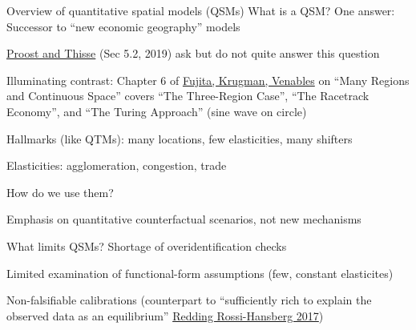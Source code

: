 \documentclass[11pt,notes=hide,aspectratio=169]{beamer}
\begin{document}
\begin{frame}{Overview of quantitative spatial models (QSMs)}
What is a QSM? One answer: Successor to ``new economic geography'' models
\begin{itemize}{\small
\item \href{https://www.aeaweb.org/articles?id=10.1257/jel.20181414}{Proost and Thisse} (Sec 5.2, 2019) ask but do not quite answer this question
\item Illuminating contrast: Chapter 6 of \href{https://direct.mit.edu/books/book/2525/The-Spatial-EconomyCities-Regions-and}{Fujita, Krugman, Venables} on 
``Many Regions and Continuous Space'' covers ``The Three-Region Case'', ``The Racetrack Economy'', and ``The Turing Approach'' (sine wave on circle)
\item Hallmarks (like QTMs): many locations, few elasticities, many shifters
\item Elasticities: agglomeration, congestion, trade
}\end{itemize}
How do we use them?
\begin{itemize}{\small
\item Emphasis on quantitative counterfactual scenarios, not new mechanisms
}\end{itemize}
What limits QSMs? Shortage of overidentification checks
\begin{itemize}{\small
\item Limited examination of functional-form assumptions (few, constant elasticites)
\item Non-falsifiable calibrations (counterpart to ``sufficiently rich to explain the observed data as an equilibrium'' \href{https://doi.org/10.1146/annurev-economics-063016-103713}{Redding Rossi-Hansberg 2017})
}\end{itemize}
\end{frame}
\begin{frame}[plain]
\begin{center}
\end{center}
\end{frame}
\end{document}
